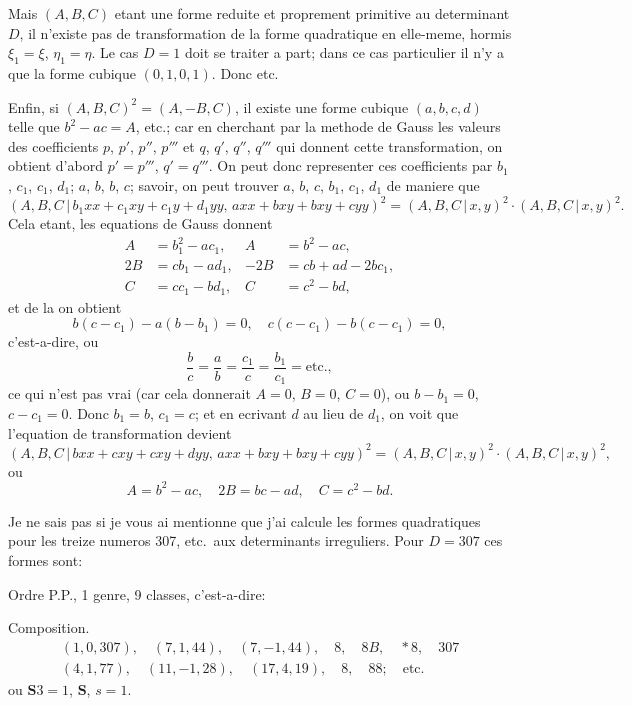 \documentclass[12pt,a4paper]{article}
\theoremstyle{plain}
\begin{document}
Mais $(A,B,C)$ etant une forme reduite et proprement primitive au determinant $D$, il n'existe pas de transformation de la forme quadratique en elle-meme, hormis $\xi_1 = \xi$, $\eta_1 = \eta$. Le cas $D=1$ doit se traiter a part; dans ce cas particulier il n'y a que la forme cubique $(0,1,0,1)$. Donc etc.

Enfin, si $(A,B,C)^2 = (A,-B,C)$, il existe une forme cubique $(a,b,c,d)$ telle que $b^2-ac = A$, etc.; car en cherchant par la methode de Gauss les valeurs des coefficients $p$, $p'$, $p''$, $p'''$ et $q$, $q'$, $q''$, $q'''$ qui donnent cette transformation, on obtient d'abord $p'=p'''$, $q'=q'''$. On peut donc representer ces coefficients par $b_1$, $c_1$, $c_1$, $d_1$; $a$, $b$, $b$, $c$; savoir, on peut trouver $a$, $b$, $c$, $b_1$, $c_1$, $d_1$ de maniere que
\[
(A,B,C \,|\, b_1 xx + c_1 xy + c_1 y + d_1 yy, \, axx + bxy + bxy + cyy)^2 = (A,B,C \,|\, x,y)^2 \cdot (A,B,C \,|\, x,y)^2.
\]
Cela etant, les equations de Gauss donnent
\begin{align*}
A &= b_1^2 - ac_1, & A &= b^2 - ac, \\
2B &= cb_1 - ad_1, & -2B &= cb + ad - 2bc_1, \\
C &= cc_1 - bd_1, & C &= c^2 - bd,
\end{align*}
et de la on obtient
\[
b(c-c_1) - a(b-b_1) = 0, \quad c(c-c_1) - b(c-c_1) = 0,
\]
c'est-a-dire, ou
\[
\frac{b}{c} = \frac{a}{b} = \frac{c_1}{c} = \frac{b_1}{c_1} = \text{etc.},
\]
ce qui n'est pas vrai (car cela donnerait $A=0$, $B=0$, $C=0$), ou $b-b_1=0$, $c-c_1=0$. Donc $b_1=b$, $c_1=c$; et en ecrivant $d$ au lieu de $d_1$, on voit que l'equation de transformation devient
\[
(A,B,C \,|\, bxx + cxy + cxy + dyy, \, axx + bxy + bxy + cyy)^2 = (A,B,C \,|\, x,y)^2 \cdot (A,B,C \,|\, x,y)^2,
\]
ou
\[
A = b^2 - ac, \quad 2B = bc - ad, \quad C = c^2 - bd.
\]

Je ne sais pas si je vous ai mentionne que j'ai calcule les formes quadratiques pour les treize numeros 307, etc.\ aux determinants irreguliers. Pour $D = 307$ ces formes sont:

Ordre P.P., 1 genre, 9 classes, c'est-a-dire:

Composition.
\begin{gather*}
(1,0,307), \quad (7,1,44), \quad (7,-1,44), \quad 8, \quad 8B, \quad *8, \quad 307 \\
(4,1,77), \quad (11,-1,28), \quad (17,4,19), \quad 8, \quad 88; \quad \text{etc.}
\end{gather*}
ou $\mathbf{S}3 = 1$, $\mathbf{S}$, $s = 1$.
\end{document}
